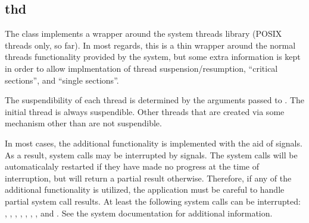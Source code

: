 %
%
%
%
%              

\subsection{thd}
\label{thd}

The  class implements a wrapper around the system threads library
(POSIX threads only, so far).  In most regards, this is a thin wrapper around
the normal threads functionality provided by the system, but some extra
information is kept in order to allow implmentation of thread
suspension/resumption, ``critical sections'', and ``single sections''.

The suspendibility of each thread is determined by the arguments passed to
.  The initial thread is always suspendible.  Other threads
that are created via some mechanism other than  are not
suspendible.

In most cases, the additional functionality is implemented with the aid of
signals.  As a result, system calls may be interrupted by signals.  The system
calls will be automaticalaly restarted if they have made no progress at the time
of interruption, but will return a partial result otherwise.  Therefore, if any
of the additional functionality is utilized, the application must be careful to
handle partial system call results.  At least the following system calls can be
interrupted: , , ,
, , , , and
.  See the system documentation for additional information.

